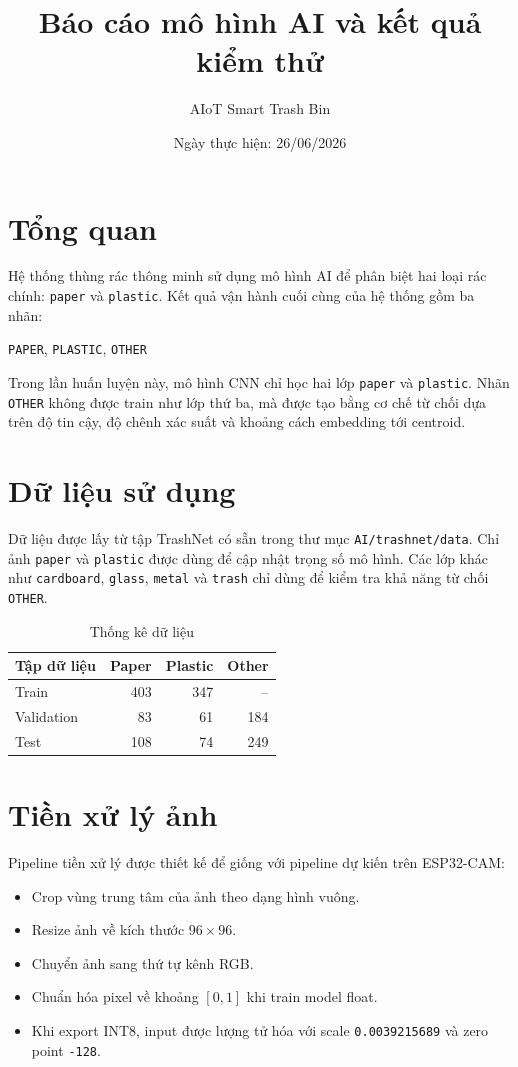 \documentclass[12pt,a4paper]{article}
\title{\textbf{Báo cáo mô hình AI và kết quả kiểm thử}}
\author{AIoT Smart Trash Bin}
\date{Ngày thực hiện: 26/06/2026}
\begin{document}
\maketitle

\section{Tổng quan}
Hệ thống thùng rác thông minh sử dụng mô hình AI để phân biệt hai loại rác
chính: \texttt{paper} và \texttt{plastic}. Kết quả vận hành cuối cùng của hệ
thống gồm ba nhãn:

\begin{center}
\texttt{PAPER}, \texttt{PLASTIC}, \texttt{OTHER}
\end{center}

Trong lần huấn luyện này, mô hình CNN chỉ học hai lớp \texttt{paper} và
\texttt{plastic}. Nhãn \texttt{OTHER} không được train như lớp thứ ba, mà được
tạo bằng cơ chế từ chối dựa trên độ tin cậy, độ chênh xác suất và khoảng cách
embedding tới centroid.

\section{Dữ liệu sử dụng}
Dữ liệu được lấy từ tập TrashNet có sẵn trong thư mục \texttt{AI/trashnet/data}.
Chỉ ảnh \texttt{paper} và \texttt{plastic} được dùng để cập nhật trọng số mô
hình. Các lớp khác như \texttt{cardboard}, \texttt{glass}, \texttt{metal} và
\texttt{trash} chỉ dùng để kiểm tra khả năng từ chối \texttt{OTHER}.

\begin{table}[H]
\centering
\caption{Thống kê dữ liệu}
\begin{tabular}{lrrr}
\toprule
\textbf{Tập dữ liệu} & \textbf{Paper} & \textbf{Plastic} & \textbf{Other} \\
\midrule
Train & 403 & 347 & -- \\
Validation & 83 & 61 & 184 \\
Test & 108 & 74 & 249 \\
\bottomrule
\end{tabular}
\end{table}

\section{Tiền xử lý ảnh}
Pipeline tiền xử lý được thiết kế để giống với pipeline dự kiến trên ESP32-CAM:

\begin{itemize}
    \item Crop vùng trung tâm của ảnh theo dạng hình vuông.
    \item Resize ảnh về kích thước $96 \times 96$.
    \item Chuyển ảnh sang thứ tự kênh RGB.
    \item Chuẩn hóa pixel về khoảng $[0, 1]$ khi train model float.
    \item Khi export INT8, input được lượng tử hóa với scale
    \texttt{0.0039215689} và zero point \texttt{-128}.
\end{itemize}
\end{document}
